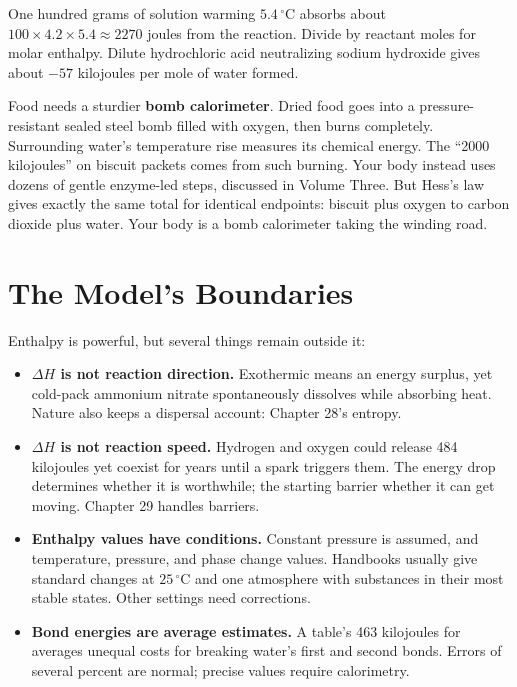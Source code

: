 One hundred grams of solution warming $5.4\,^{\circ}\mathrm{C}$ absorbs about $100\times4.2\times5.4\approx2270$ joules from the reaction. Divide by reactant moles for molar enthalpy. Dilute hydrochloric acid neutralizing sodium hydroxide gives about $-57$ kilojoules per mole of water formed.

Food needs a sturdier \textbf{bomb calorimeter}. Dried food goes into a pressure-resistant sealed steel bomb filled with oxygen, then burns completely. Surrounding water's temperature rise measures its chemical energy. The ``2000 kilojoules'' on biscuit packets comes from such burning. Your body instead uses dozens of gentle enzyme-led steps, discussed in Volume Three. But Hess's law gives exactly the same total for identical endpoints: biscuit plus oxygen to carbon dioxide plus water. Your body is a bomb calorimeter taking the winding road.

\section{The Model's Boundaries}

Enthalpy is powerful, but several things remain outside it:

\begin{itemize}[itemsep=2pt]
\item \textbf{$\Delta H$ is not reaction direction.} Exothermic means an energy surplus, yet cold-pack ammonium nitrate spontaneously dissolves while absorbing heat. Nature also keeps a dispersal account: Chapter 28's entropy.
\item \textbf{$\Delta H$ is not reaction speed.} Hydrogen and oxygen could release 484 kilojoules yet coexist for years until a spark triggers them. The energy drop determines whether it is worthwhile; the starting barrier whether it can get moving. Chapter 29 handles barriers.
\item \textbf{Enthalpy values have conditions.} Constant pressure is assumed, and temperature, pressure, and phase change values. Handbooks usually give standard changes at $25\,^{\circ}\mathrm{C}$ and one atmosphere with substances in their most stable states. Other settings need corrections.
\item \textbf{Bond energies are average estimates.} A table's 463 kilojoules for  averages unequal costs for breaking water's first and second  bonds. Errors of several percent are normal; precise values require calorimetry.
\end{itemize}

